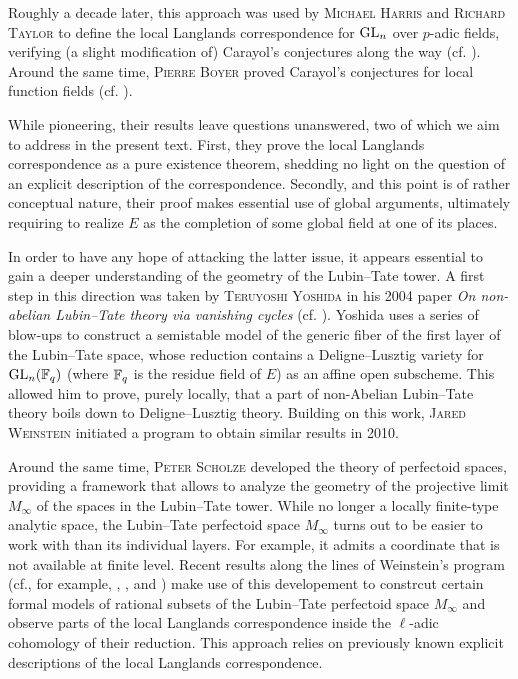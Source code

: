 \documentclass[../main.tex]{subfiles}
\begin{document}
Roughly a decade later, this approach was used by \textsc{Michael Harris} and
\textsc{Richard Taylor} to define the local Langlands correspondence for
$\operatorname{GL}_n$ over $p$-adic fields, verifying (a slight modification of)
Carayol's conjectures along the way (cf. \cite{HTShimura}). 
Around the same time, \textsc{Pierre Boyer} 
proved Carayol's conjectures for local function fields (cf. \cite{boyer1999mauvaise}). 

While pioneering, their results leave questions unanswered, two of which we aim
to address in the present text. First, they prove the local Langlands correspondence
as a pure existence theorem, shedding no light on the question of an explicit description
of the correspondence. Secondly, and this point is of rather conceptual nature, 
their proof makes essential use of global arguments, ultimately requiring to 
realize $E$ as the completion of some global field at one of its places.

In order to have any hope of attacking the latter issue, it appears essential
to gain a deeper understanding of the geometry of the Lubin--Tate tower. 
A first step in this direction was taken by \textsc{Teruyoshi Yoshida} in his
2004 paper \textit{On non-abelian Lubin--Tate theory via vanishing cycles}
(cf. \cite{yoshida2010non}).
Yoshida uses a series of blow-ups to construct a
semistable model of the generic fiber of the first layer of the Lubin--Tate space,
whose reduction contains a Deligne--Lusztig variety for $\operatorname{GL}_n(\mathbb{F}_q)$ (where
$\mathbb{F}_q$ is the residue field of $E$) as an affine open subscheme. This allowed
him to prove, purely locally, that a part of non-Abelian Lubin--Tate theory
boils down to Deligne--Lusztig theory. 
Building on this work, \textsc{Jared Weinstein} initiated a program
to obtain similar results in 2010. 

Around the same time, \textsc{Peter Scholze} developed the theory of perfectoid spaces,
providing a framework that allows to analyze the geometry of the projective limit 
$M_\infty$ of the spaces in the Lubin--Tate tower. 
While no longer a locally finite-type analytic space, the
Lubin--Tate perfectoid space $M_\infty$ turns out to be easier to work with than 
its individual layers. For example, it admits a coordinate that is not
available at finite level.
Recent results along the lines of Weinstein's program
(cf., for example, \cite{weinstein2016semistable},
\cite{BoyarchenkoWeinstein2011MaxVar}, \cite{imaitsushima2020affinoids} and 
\cite{tokimoto2020affinoids}) make use of this developement to constrcut
certain formal models of rational subsets of the Lubin--Tate perfectoid space
$M_{\infty}$ and observe parts of the local Langlands correspondence
inside the $\ell$-adic cohomology of their reduction. This approach relies on
previously known explicit descriptions of the local Langlands
correspondence.
\end{document}
